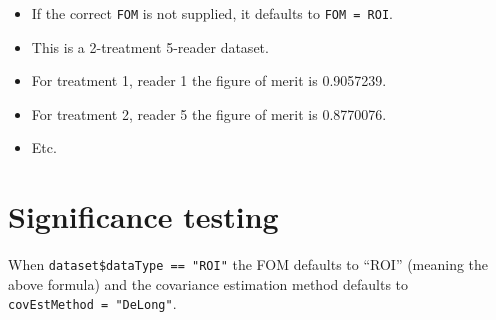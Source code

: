 \documentclass[]{book}
\providecommand{\tightlist}{%
  \setlength{\itemsep}{0pt}\setlength{\parskip}{0pt}}
\begin{document}
\begin{itemize}
\tightlist
\item
  If the correct \texttt{FOM} is not supplied, it defaults to \texttt{FOM\ =\ ROI}.\\
\item
  This is a 2-treatment 5-reader dataset.\\
\item
  For treatment 1, reader 1 the figure of merit is 0.9057239.\\
\item
  For treatment 2, reader 5 the figure of merit is 0.8770076.\\
\item
  Etc.
\end{itemize}

\hypertarget{significance-testing}{%
\section{Significance testing}\label{significance-testing}}

When \texttt{dataset\$dataType\ ==\ "ROI"} the FOM defaults to ``ROI'' (meaning the above formula) and the covariance estimation method defaults to \texttt{covEstMethod\ =\ "DeLong"}.
\end{document}
